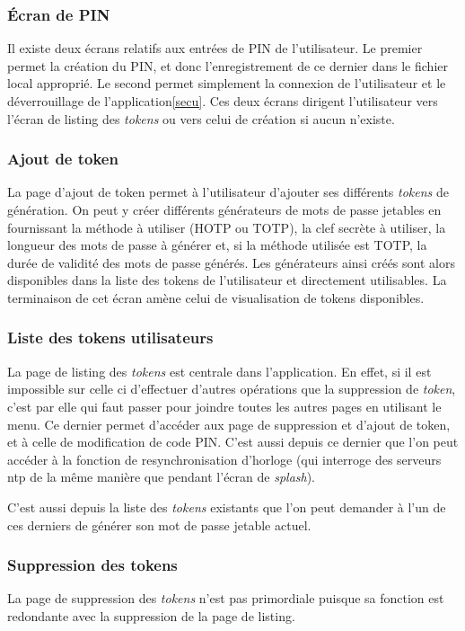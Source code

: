 \subsubsection{Écran de PIN}
Il existe deux écrans relatifs aux entrées de PIN de l'utilisateur. Le premier permet la création
du PIN, et donc l'enregistrement de ce dernier dans le fichier local approprié. Le second permet
simplement la connexion de l'utilisateur et le déverrouillage de l'application\ref{secu}. Ces deux
écrans dirigent l'utilisateur vers l'écran de listing des \emph{tokens} ou vers celui de création
si aucun n'existe.

\subsubsection{Ajout de token}
La page d'ajout de token permet à l'utilisateur d'ajouter ses différents \emph{tokens} de
génération. On peut y créer différents générateurs de mots de passe jetables en fournissant la
méthode à utiliser (HOTP ou TOTP), la clef secrète à utiliser, la longueur des mots de passe à
générer et, si la méthode utilisée est TOTP, la durée de validité des mots de passe générés. Les
générateurs ainsi créés sont alors disponibles dans la liste des tokens de l'utilisateur et
directement utilisables. La terminaison de cet écran amène celui de visualisation de tokens
disponibles.

\subsubsection{Liste des tokens utilisateurs}
La page de listing des \emph{tokens} est centrale dans l'application. En effet, si il est impossible sur
celle ci d'effectuer d'autres opérations que la suppression de \emph{token}, c'est par elle qui faut
passer pour joindre toutes les autres pages en utilisant le menu. Ce dernier permet d'accéder aux page
de suppression et d'ajout de token, et à celle de modification de code PIN. C'est aussi depuis ce
dernier que l'on peut accéder à la fonction de resynchronisation d'horloge (qui interroge des serveurs
ntp de la même manière que pendant l'écran de \emph{splash}).

C'est aussi depuis la liste des \emph{tokens} existants que l'on peut demander à l'un de ces derniers
de générer son mot de passe jetable actuel.

\subsubsection{Suppression des tokens}
La page de suppression des \emph{tokens} n'est pas primordiale puisque sa fonction est redondante avec
la suppression de la page de listing.

